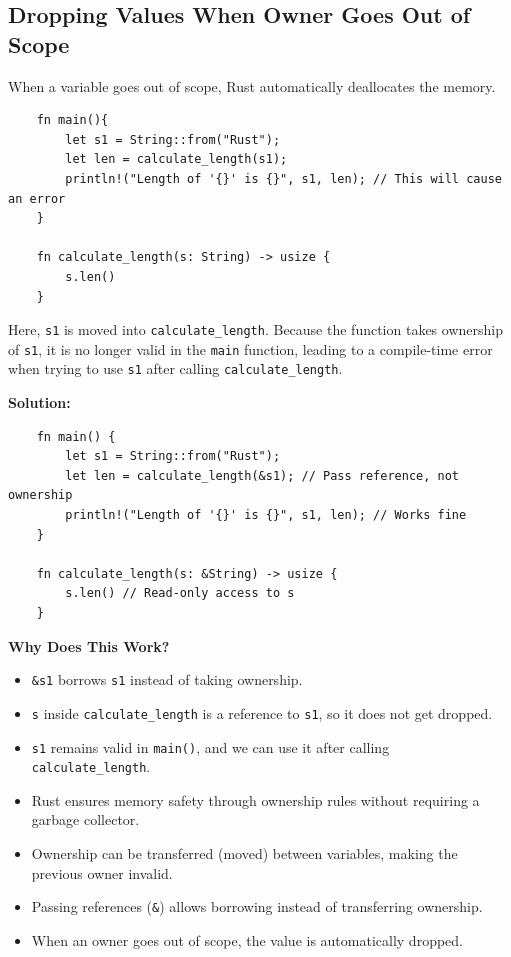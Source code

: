 \documentclass[a4paper,12pt]{report}
\begin{document}
\subsection*{Dropping Values When Owner Goes Out of Scope}
When a variable goes out of scope, Rust automatically deallocates the memory.

\begin{lstlisting}
	fn main(){
		let s1 = String::from("Rust");
		let len = calculate_length(s1);
		println!("Length of '{}' is {}", s1, len); // This will cause an error
	}
	
	fn calculate_length(s: String) -> usize { 
		s.len()
	}
\end{lstlisting}

	\noindent Here, \texttt{s1} is moved into \texttt{calculate\_length}. Because the function takes ownership of \texttt{s1}, it is no longer valid in the \texttt{main} function, leading to a compile-time error when trying to use \texttt{s1} after calling \texttt{calculate\_length}.


	\noindent\textbf{Solution: }

\begin{lstlisting}
	fn main() {
		let s1 = String::from("Rust");
		let len = calculate_length(&s1); // Pass reference, not ownership
		println!("Length of '{}' is {}", s1, len); // Works fine
	}
	
	fn calculate_length(s: &String) -> usize { 
		s.len() // Read-only access to s
	}
\end{lstlisting}
\textbf{Why Does This Work?}

\begin{itemize}
	\item \texttt{\&s1} borrows \texttt{s1} instead of taking ownership.
	\item \texttt{s} inside \texttt{calculate\_length} is a reference to \texttt{s1}, so it does not get dropped.
	\item \texttt{s1} remains valid in \texttt{main()}, and we can use it after calling \texttt{calculate\_length}.
\end{itemize}


\begin{takeawaybox}
	\begin{itemize}
		\item Rust ensures memory safety through ownership rules without requiring a garbage collector.
		\item Ownership can be transferred (moved) between variables, making the previous owner invalid.
		\item Passing references (\texttt{\&}) allows borrowing instead of transferring ownership.
		\item When an owner goes out of scope, the value is automatically dropped.
	\end{itemize}
\end{takeawaybox}
\end{document}
